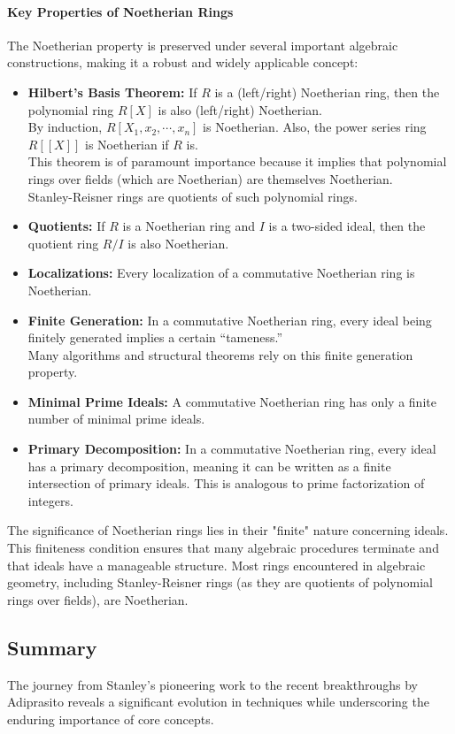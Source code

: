 \documentclass[12pt]{article}
\theoremstyle{definition}
\numberwithin{equation}{subsection}
\begin{document}
\paragraph{Key Properties of Noetherian Rings}
The Noetherian property is preserved under several important algebraic constructions, making it a robust and widely applicable concept:
\begin{itemize}
\item \textbf{Hilbert's Basis Theorem:} If $R$ is a (left/right) Noetherian ring, then the polynomial ring $R[X]$ is also (left/right) Noetherian.\\
By induction, $R[X_1, x_2, \cdots, x_n]$ is Noetherian. Also, the power series ring $R[[X]]$ is Noetherian if $R$ is.\\
This theorem is of paramount importance because it implies that polynomial rings over fields (which are Noetherian) are themselves Noetherian.\\
Stanley-Reisner rings are quotients of such polynomial rings.
\item \textbf{Quotients:} If $R$ is a Noetherian ring and $I$ is a two-sided ideal, then the quotient ring $R/I$ is also Noetherian.
\item \textbf{Localizations:} Every localization of a commutative Noetherian ring is Noetherian.
\item \textbf{Finite Generation:} In a commutative Noetherian ring, every ideal being finitely generated implies a certain ``tameness.''\\
Many algorithms and structural theorems rely on this finite generation property.
\item \textbf{Minimal Prime Ideals:} A commutative Noetherian ring has only a finite number of minimal prime ideals.
\item \textbf{Primary Decomposition:} In a commutative Noetherian ring, every ideal has a primary decomposition, meaning it can be written as a finite intersection of primary ideals. This is analogous to prime factorization of integers.
\end{itemize}
The significance of Noetherian rings lies in their "finite" nature concerning ideals. This finiteness condition ensures that many algebraic procedures terminate and that ideals have a manageable structure. Most rings encountered in algebraic geometry, including Stanley-Reisner rings (as they are quotients of polynomial rings over fields), are Noetherian.   

\subsection{Summary}
The journey from Stanley's pioneering work to the recent breakthroughs by Adiprasito reveals a significant evolution in techniques while underscoring the enduring importance of core concepts.
\end{document}
